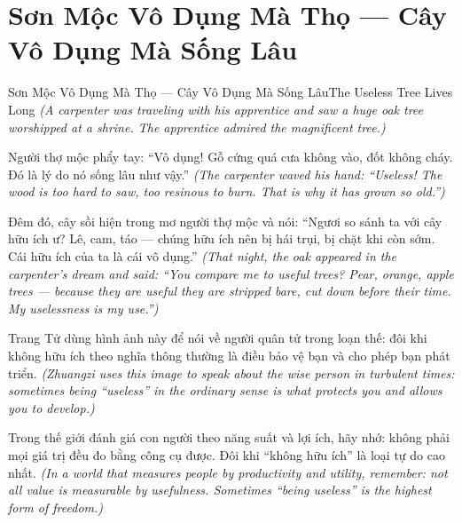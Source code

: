 \section{Sơn Mộc Vô Dụng Mà Thọ — Cây Vô Dụng Mà Sống Lâu}
\begin{truyen}{Sơn Mộc Vô Dụng Mà Thọ — Cây Vô Dụng Mà Sống Lâu}{The Useless Tree Lives Long}
\textit{(A carpenter was traveling with his apprentice and saw a huge oak tree worshipped at a shrine. The apprentice admired the magnificent tree.)}

Người thợ mộc phẩy tay: ``Vô dụng! Gỗ cứng quá cưa không vào, đốt không cháy. Đó là lý do nó sống lâu như vậy.''
\textit{(The carpenter waved his hand: ``Useless! The wood is too hard to saw, too resinous to burn. That is why it has grown so old.'')}

Đêm đó, cây sồi hiện trong mơ người thợ mộc và nói: ``Ngươi so sánh ta với cây hữu ích ư? Lê, cam, táo — chúng hữu ích nên bị hái trụi, bị chặt khi còn sớm. Cái hữu ích của ta là cái vô dụng.''
\textit{(That night, the oak appeared in the carpenter's dream and said: ``You compare me to useful trees? Pear, orange, apple trees — because they are useful they are stripped bare, cut down before their time. My uselessness is my use.'')}

Trang Tử dùng hình ảnh này để nói về người quân tử trong loạn thế: đôi khi không hữu ích theo nghĩa thông thường là điều bảo vệ bạn và cho phép bạn phát triển.
\textit{(Zhuangzi uses this image to speak about the wise person in turbulent times: sometimes being ``useless'' in the ordinary sense is what protects you and allows you to develop.)}

\end{truyen}

\begin{baihoc}
Trong thế giới đánh giá con người theo năng suất và lợi ích, hãy nhớ: không phải mọi giá trị đều đo bằng công cụ được. Đôi khi ``không hữu ích'' là loại tự do cao nhất.
\textit{(In a world that measures people by productivity and utility, remember: not all value is measurable by usefulness. Sometimes ``being useless'' is the highest form of freedom.)}
\end{baihoc}
\ngancach

